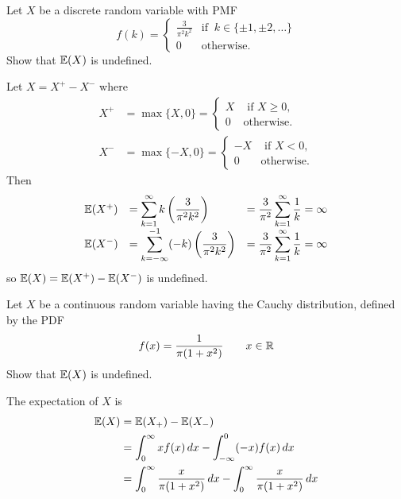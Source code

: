 \begin{exercise}
\begin{questions}
\question
Let $X$ be a discrete random variable with PMF
\[
f(k) = \begin{cases}
	\displaystyle\frac{3}{\pi^2 k^2} 	& \text{if }\ k\in\{\pm 1,\pm 2, \ldots\} \\[2ex]
	0						& \text{otherwise.}
\end{cases}	
\]
Show that $\mathbb{E}(X)$ is undefined.

\begin{answer}
Let $X = X^{+} - X^{-}$ where
\begin{align*}
X^{+}	& = \max\{X,0\} 	= \begin{cases}  X & \text{ if } X \geq 0, \\ 0 & \text{otherwise.}\end{cases} \\
X^{-}	& = \max\{-X,0\}	= \begin{cases} -X & \text{ if } X <    0, \\ 0 & \text{otherwise.}\end{cases}
\end{align*}
Then
\[\begin{array}{lll}
\mathbb{E}(X^{+})	
	& = \displaystyle \sum_{k=1}^{\infty} k \left(\frac{3}{\pi^2 k^2}\right)
	& = \displaystyle \frac{3}{\pi^2} \sum_{k=1}^{\infty}\frac{1}{k} = \infty \\
\mathbb{E}(X^{-})	
	& = \displaystyle \sum_{k=-\infty}^{-1} (-k) \left(\frac{3}{\pi^2 k^2}\right)
	& = \displaystyle \frac{3}{\pi^2} \sum_{k=1}^{\infty}\frac{1}{k} = \infty \\
\end{array}\]
so $\mathbb{E}(X) = \mathbb{E}(X^{+}) - \mathbb{E}(X^{-})$ is undefined.
\end{answer}

\question
Let $X$ be a continuous random variable having the Cauchy distribution, defined by the PDF
\[
f(x) = \frac{1}{\pi(1+x^2)}\qquad x\in\mathbb{R}
\]
Show that $\mathbb{E}(X)$ is undefined.
\begin{answer}
The expectation of $X$ is 
\begin{align*}
\mathbb{E}(X)
	& = \mathbb{E}(X_{+}) - \mathbb{E}(X_{-}) \\
	& = \int_0^\infty xf(x)\,dx - \int_{-\infty}^0 (-x)f(x)\,dx \\
	& = \int_0^\infty \frac{x}{\pi(1+x^2)}\,dx - \int_0^{\infty} \frac{x}{\pi(1+x^2)}\,dx
\end{align*}


\end{answer}
\end{questions}
\end{exercise}
